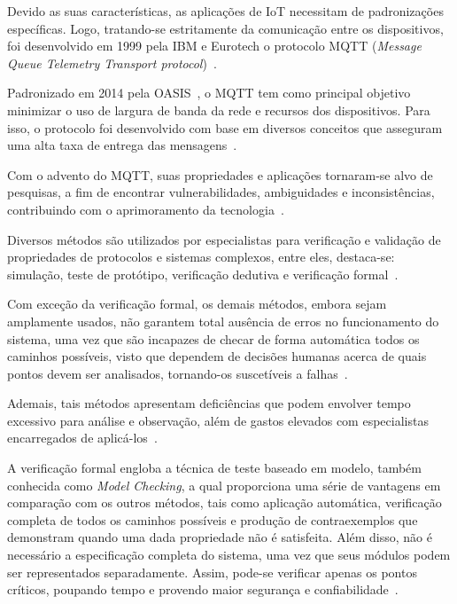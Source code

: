 Devido as suas características, as aplicações de IoT necessitam de padronizações específicas. Logo, tratando-se estritamente da comunicação entre os dispositivos, foi desenvolvido em 1999 pela IBM e Eurotech o protocolo MQTT (\textit{Message Queue Telemetry Transport protocol})~\cite{mqttv3.1}. 

Padronizado em 2014 pela OASIS~\cite{mqttv3.1.1}, o MQTT tem como principal objetivo minimizar o uso de largura de banda da rede e recursos dos dispositivos. Para isso, o protocolo foi desenvolvido com base em diversos conceitos que asseguram uma alta taxa de entrega das mensagens~\cite{chen2014responsive}.

Com o advento do MQTT, suas propriedades e aplicações tornaram-se alvo de pesquisas, a fim de encontrar vulnerabilidades, ambiguidades e inconsistências, contribuindo com o aprimoramento da tecnologia~\cite{aziz2016formal, mladenov2017formal}.

Diversos métodos são utilizados por especialistas para verificação e validação de propriedades de protocolos e sistemas complexos, entre eles, destaca-se: simulação, teste de protótipo, verificação dedutiva e verificação formal~\cite{clarke1999model}. 

Com exceção da verificação formal, os demais métodos, embora sejam amplamente usados, não garantem total ausência de erros no funcionamento do sistema, uma vez que são incapazes de checar de forma automática todos os caminhos possíveis, visto que dependem de decisões humanas acerca de quais pontos devem ser analisados, tornando-os suscetíveis a falhas~\cite{clarke1999model}. 

Ademais, tais métodos apresentam deficiências que podem envolver tempo excessivo para análise e observação, além de gastos elevados com especialistas encarregados de aplicá-los~\cite{clarke1999model}.

A verificação formal engloba a técnica de teste baseado em modelo, também conhecida como \textit{Model Checking}, a qual proporciona uma série de vantagens em comparação com os outros métodos, tais como aplicação automática, verificação completa de todos os caminhos possíveis e produção de contraexemplos que demonstram quando uma dada propriedade não é satisfeita. Além disso, não é necessário a especificação completa do sistema, uma vez que seus módulos podem ser representados separadamente. Assim, pode-se verificar apenas os pontos críticos, poupando tempo e provendo maior segurança e confiabilidade~\cite{clarke1999model}.

